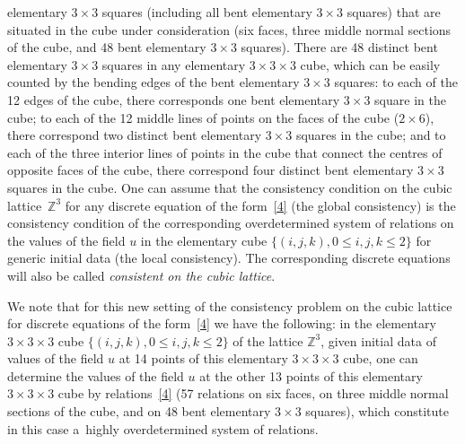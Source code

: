 \documentclass[pdftex]{sigma}
\begin{document}
elementary $3 \times 3$ squares (including all bent elementary $3
\times 3$ squares) that are situated in the cube under consideration
(six faces, three middle normal sections of the cube, and 48 bent
elementary $3 \times 3$ squares). There are 48 distinct bent
elementary $3 \times 3$ squares in any elementary $3 \times 3 \times
3$ cube, which can be easily counted by the bending edges of the
bent elementary $3 \times 3$ squares: to each of the 12 edges of the
cube, there corresponds one bent elementary $3 \times 3$ square in
the cube; to each of the 12 middle lines of points on the faces of
the cube ($2 \times 6$), there correspond two distinct bent
elementary $3 \times 3$ squares in the cube; and to each of the
three interior lines of points in the cube that connect the centres
of opposite faces of the cube, there correspond four distinct bent
elementary $3 \times 3$ squares in the cube. One can assume that the
consistency condition on the cubic lattice~$\mathbb{Z}^3$ for any
discrete equation of the form~\eqref{4} (the global consistency) is the consistency condition
of the corresponding overdetermined system of relations on the
values of the f\/ield $u$ in the elementary cube $\{(i, j, k), 0
\leq i, j, k \leq 2 \}$ for generic initial data (the local consistency). The corresponding
discrete equations will also be called {\it consistent on the cubic
lattice}.




We note that for this new setting of the consistency problem on the
cubic lattice for discrete equations of the form~\eqref{4} we have
the following: in the elementary $3 \times 3 \times 3$ cube $\{(i,
j, k),  0 \leq i, j, k \leq 2 \}$ of the lattice $\mathbb{Z}^3$,
given initial data of values of the f\/ield $u$ at 14 points of this
elementary $3 \times 3 \times 3$ cube, one can determine the values
of the f\/ield $u$ at the other 13 points of this elementary $3 \times
3 \times 3$ cube by relations~\eqref{4} (57 relations on six faces,
on three middle normal sections of the cube, and on 48 bent
elementary $3 \times 3$ squares), which constitute in this case a~highly overdetermined system of relations.
\end{document}
